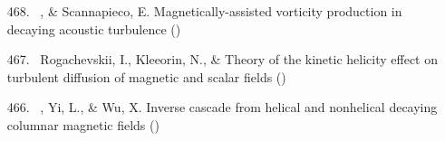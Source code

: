 \begin{itemize}






\item[{468.}~]
\Brandenburg, \& Scannapieco, E.
{Magnetically-assisted vorticity production in decaying acoustic turbulence}
()

\item[{467.}~]
Rogachevskii, I., Kleeorin, N., \& \Brandenburg{}
{Theory of the kinetic helicity effect on turbulent diffusion of magnetic and scalar fields}
()

\item[{466.}~]
\Brandenburg, Yi, L., \& Wu, X.
{Inverse cascade from helical and nonhelical decaying columnar magnetic fields}
()


\end{itemize}

